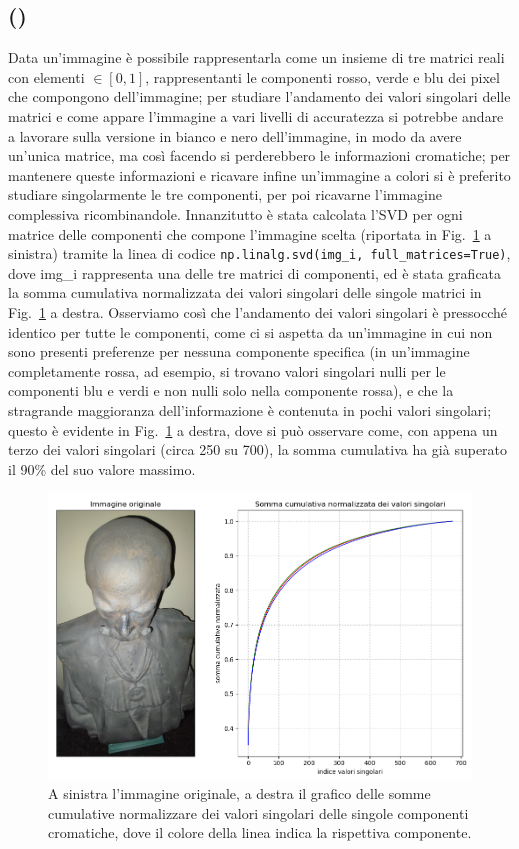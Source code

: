 \documentclass[a4paper]{article}
\newcounter{count_es}
\newcounter{count_sub_es}[count_es]
\renewcommand{\figurename}{Fig.}
\begin{document}
\subsection*{ ()}
Data un'immagine è possibile rappresentarla come un insieme di tre matrici reali
con elementi \(\in [0,1]\), rappresentanti le componenti rosso, verde e blu dei pixel che
compongono dell'immagine; per studiare l'andamento dei valori singolari delle matrici e come appare
l'immagine a vari livelli di accuratezza si potrebbe andare a lavorare sulla versione in bianco e nero dell'immagine,
in modo da avere un'unica matrice, ma così facendo si perderebbero le informazioni cromatiche; per mantenere queste informazioni e ricavare
infine un'immagine a colori si è preferito studiare singolarmente le tre componenti, per poi ricavarne l'immagine complessiva ricombinandole.
Innanzitutto è stata calcolata l'SVD per ogni matrice delle componenti che compone l'immagine scelta (riportata in \figurename~\ref{fig:es_2b_1} a sinistra) tramite
la linea di codice \lstinline{np.linalg.svd(img_i, full_matrices=True)},
dove img\_i rappresenta una delle tre matrici di componenti, ed è stata graficata la somma cumulativa normalizzata dei valori singolari delle singole matrici in \figurename~\ref{fig:es_2b_1} a destra. 
Osserviamo così che l'andamento dei valori singolari è pressocché identico per tutte le componenti, come ci si aspetta
da un'immagine in cui non sono presenti preferenze per nessuna componente specifica (in un'immagine completamente rossa, ad esempio, si trovano 
valori singolari nulli per le componenti blu e verdi e non nulli solo nella componente rossa), e che la stragrande maggioranza dell'informazione è
contenuta in pochi valori singolari; questo è evidente in \figurename~\ref{fig:es_2b_1} a destra, dove si può osservare come, con appena un terzo dei
valori singolari (circa 250 su 700), la somma cumulativa ha già superato il 90\% del suo valore massimo.
\begin{figure}[H]
    \centering
    \includegraphics[width=.75\linewidth]{Es_2b_1.png}
    \caption{A sinistra l'immagine originale, a destra il grafico delle somme cumulative normalizzare
    dei valori singolari delle singole componenti cromatiche, dove il colore della linea indica la rispettiva componente.\label{fig:es_2b_1}}
\end{figure}
\end{document}

